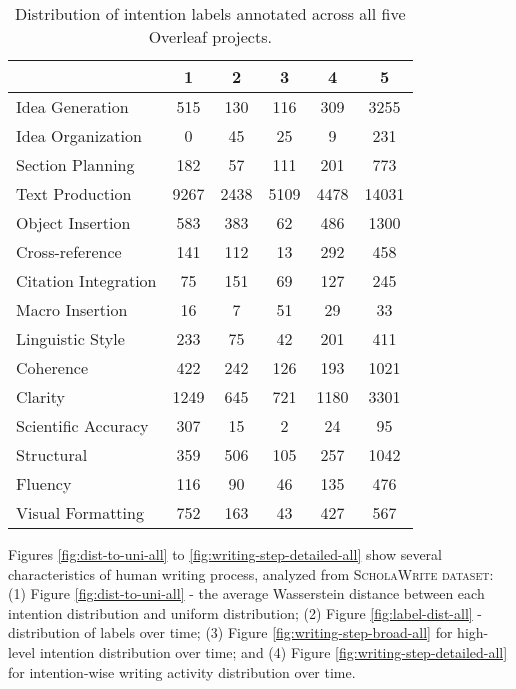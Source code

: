 \begin{table}[ht!]
    \centering
    \footnotesize
    \begin{tabular}{@{}l|ccccc@{}}
        \toprule
         & 1 & 2 & 3 & 4 & 5 \\
        \midrule \midrule
        Idea Generation & 515 & 130 & 116 & 309 & 3255 \\
        Idea Organization & 0 & 45 & 25 & 9 & 231 \\
        Section Planning & 182 & 57 & 111 & 201 & 773 \\
        \midrule
        Text Production & 9267 & 2438 & 5109 & 4478 & 14031 \\
        Object Insertion & 583 & 383 & 62 & 486 & 1300 \\
        Cross-reference & 141 & 112 & 13 & 292 & 458 \\
        Citation Integration & 75 & 151 & 69 & 127 & 245 \\
        Macro Insertion & 16 & 7 & 51 & 29 & 33 \\
        \midrule 
        Linguistic Style & 233 & 75 & 42 & 201 & 411 \\
        Coherence & 422 & 242 & 126 & 193 & 1021 \\
        Clarity & 1249 & 645 & 721 & 1180 & 3301 \\
        Scientific Accuracy & 307 & 15 & 2 & 24 & 95 \\
        Structural & 359 & 506 & 105 & 257 & 1042 \\
        Fluency & 116 & 90 & 46 & 135 & 476 \\
        Visual Formatting & 752 & 163 & 43 & 427 & 567 \\
        \bottomrule
        \end{tabular}
    \caption{Distribution of intention labels annotated across all five Overleaf projects.} \label{table:label_distribution_all}
\end{table}

Figures \ref{fig:dist-to-uni-all} to \ref{fig:writing-step-detailed-all} show several characteristics of human writing process, analyzed from \textsc{ScholaWrite dataset}: (1) Figure \ref{fig:dist-to-uni-all} -  the average Wasserstein distance between each intention distribution and uniform distribution; (2) Figure \ref{fig:label-dist-all} - distribution of labels over time; (3) Figure \ref{fig:writing-step-broad-all} for high-level intention distribution over time; and (4) Figure \ref{fig:writing-step-detailed-all} for intention-wise writing activity distribution over time. 


